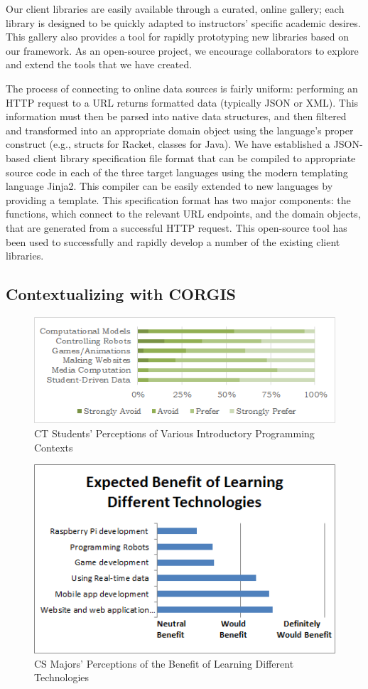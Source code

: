 Our client libraries are easily available through a curated, online gallery; each library is designed to be quickly adapted to instructors' specific academic desires. 
This gallery also provides a tool for rapidly prototyping new libraries based on our framework.
As an open-source project, we encourage collaborators to explore and extend the tools that we have created.

The process of connecting to online data sources is fairly uniform: performing an HTTP request to a URL returns formatted data (typically JSON or XML). 
This information must then be parsed into native data structures, and then filtered and transformed into an appropriate domain object using the language's proper construct (e.g., structs for Racket, classes for Java).
We have established a JSON-based client library specification file format that can be compiled to appropriate source code in each of the three target languages using the modern templating language Jinja2. 
This compiler can be easily extended to new languages by providing a template.
This specification format has two major components: the functions, which connect to the relevant URL endpoints, and the domain objects, that are generated from a successful HTTP request. 
This open-source tool has been used to successfully and rapidly develop a number of the existing client libraries.

\subsection{Contextualizing with CORGIS}

\begin{figure}
		\begin{center}
        \includegraphics[width=.75\linewidth]{images/surveyContexts.png}
		\end{center}
		\caption{CT Students' Perceptions of Various Introductory Programming Contexts}
		\label{fig-contexts-compared}
\end{figure}

\begin{figure}
		\begin{center}
                \includegraphics[width=.5\linewidth]{images/expected-benefit.png}
		\end{center}
		\caption{CS Majors' Perceptions of the Benefit of Learning Different Technologies}
		\label{fig-expected-benefit}
\end{figure}

